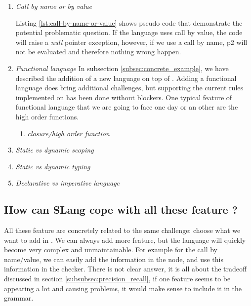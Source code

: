 \begin{enumerate}
	\item \textit{Call by name or by value} \newline
	
	
	Listing \ref{lst:call-by-name-or-value} shows pseudo code that demonstrate the potential problematic question. If the language uses call by value, the code will raise a \emph{null} pointer exception, however, if we use a call by name, p2 will not be evaluated and therefore nothing wrong happen. \newline
	\item \textit{Functional language} \newline
	In subsection \ref{subsec:concrete_example}, we have described the addition of a new language on top of \slang.
	Adding a functional language does bring additional challenges, but supporting the current rules implemented on \slang has been done without blockers. \newline
	One typical feature of functional language that we are going to face one day or an other are the high order functions.
	\begin{enumerate}
		\item \textit{closure/high order function} \newline
	\end{enumerate}

	\item \textit{Static vs dynamic scoping} \newline
	\item \textit{Static vs dynamic typing} \newline
	\item \textit{Declarative vs imperative language} \newline
\end{enumerate}

\subsection{How can SLang cope with all these feature ?}
\label{subsec:how_can_slang_cope_with_features}

All these feature are concretely related to the same challenge: choose what we want to add in \slang{}. 
We can always add more feature, but the language will quickly become very complex and unmaintainable. For example for the call by name/value, we can easily add the information in the node, and use this information in the checker. 
There is not clear answer, it is all about the tradeoff discussed in section \ref{subsubsec:precision_recall}, if one feature seems to be appearing a lot and causing problems, it would make sense to include it in the grammar.
